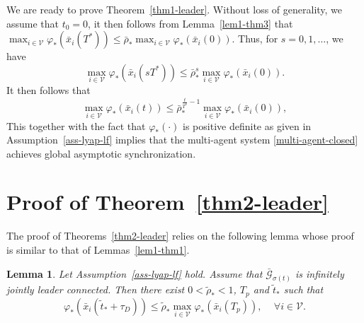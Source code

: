 \documentclass[a4paper, 11pt]{article}
\newtheorem{lemma}{Lemma}
\begin{document}
We are ready to prove Theorem~\ref{thm1-leader}. Without loss of generality, we assume that $t_0=0$, it then follows from Lemma~\ref{lem1-thm3} that $\max_{i \in \mathcal{V}}\varphi_*(\bar{x}_i(T^*)) \leq \bar{\rho}_* \max_{i \in \mathcal{V}}\varphi_*(\bar{x}_i(0))$. Thus, for $s=0,1,\ldots$, we have
\[
\max_{i \in \mathcal{V}}\varphi_*(\bar{x}_i(sT^*)) \leq \bar{\rho}_* ^s \max_{i \in \mathcal{V}}\varphi_*(\bar{x}_i(0)).
\]
It then follows that
\begin{equation*}
\max_{i \in \mathcal{V}}\varphi_*(\bar{x}_i(t)) \leq {\bar{\rho}}^{\frac{t}{T^*}-1} _* \max_{i \in \mathcal{V}}\varphi_*(\bar{x}_i(0)),
\end{equation*}
This together with the fact that $\varphi_*(\cdot)$ is positive definite as given in Assumption~\ref{ass-lyap-lf} implies that
the multi-agent system \eqref{multi-agent-closed} achieves global asymptotic synchronization.

\section{Proof of Theorem~\ref{thm2-leader}}\label{app-lf2}
The proof of Theorems~\ref{thm2-leader} relies on the following lemma whose proof is similar to that of Lemmas~\ref{lem1-thm1}.

\begin{lemma}\label{lem1-thm4}
Let Assumption~\ref{ass-lyap-lf} hold. Assume that $\bar{\mathcal{G}}_{\sigma(t)}$ is infinitely jointly leader connected.
Then there exist $0<\tilde{\rho}_*<1$, $T_p$ and $\tilde{t}_*$ such that
\[
\varphi_*(\bar{x}_i(\tilde{t}_*+\tau_D)) \leq \tilde{\rho}_* \max_{i \in \mathcal{V}}\varphi_*(\bar{x}_i(T_p)), \quad \, \forall i \in \mathcal{V}.
\]
\end{lemma}
\end{document}
